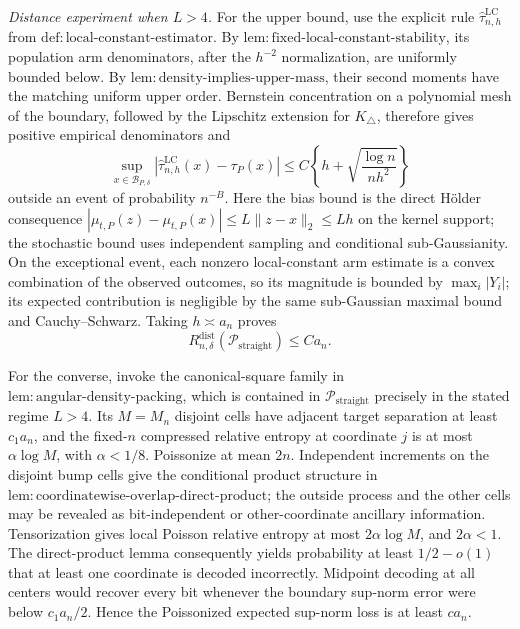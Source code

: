 \emph{Distance experiment when \(L>4\).}
For the upper bound, use the explicit rule \(\widehat\tau^{\mathrm{LC}}_{n,h}\) from \(\mathrm{def:local\text{-}constant\text{-}estimator}\).  By \(\mathrm{lem:fixed\text{-}local\text{-}constant\text{-}stability}\), its population arm denominators, after the \(h^{-2}\) normalization, are uniformly bounded below.  By \(\mathrm{lem:density\text{-}implies\text{-}upper\text{-}mass}\), their second moments have the matching uniform upper order.  Bernstein concentration on a polynomial mesh of the boundary, followed by the Lipschitz extension for \(K_\triangle\), therefore gives positive empirical denominators and
\[
 \sup_{x\in\mathcal B_{P,\delta}}
 |\widehat\tau^{\mathrm{LC}}_{n,h}(x)-\tau_P(x)|
 \leq C\left\{h+\sqrt{\frac{\log n}{nh^2}}\right\}
\]
outside an event of probability \(n^{-B}\).  Here the bias bound is the direct H\"older consequence
\(|\mu_{t,P}(z)-\mu_{t,P}(x)|\leq L\lVert z-x\rVert_2\leq Lh\) on the kernel support; the stochastic bound uses independent sampling and conditional sub-Gaussianity.  On the exceptional event, each nonzero local-constant arm estimate is a convex combination of the observed outcomes, so its magnitude is bounded by \(\max_i|Y_i|\); its expected contribution is negligible by the same sub-Gaussian maximal bound and Cauchy--Schwarz.  Taking \(h\asymp a_n\) proves
\[
 R_{n,\delta}^{\mathrm{dist}}(\mathcal P_{\mathrm{straight}})
 \leq Ca_n.
\]

For the converse, invoke the canonical-square family in \(\mathrm{lem:angular\text{-}density\text{-}packing}\), which is contained in \(\mathcal P_{\mathrm{straight}}\) precisely in the stated regime \(L>4\).  Its \(M=M_n\) disjoint cells have adjacent target separation at least \(c_1a_n\), and the fixed-\(n\) compressed relative entropy at coordinate \(j\) is at most \(\alpha\log M\), with \(\alpha<1/8\).  Poissonize at mean \(2n\).  Independent increments on the disjoint bump cells give the conditional product structure in \(\mathrm{lem:coordinatewise\text{-}overlap\text{-}direct\text{-}product}\); the outside process and the other cells may be revealed as bit-independent or other-coordinate ancillary information.  Tensorization gives local Poisson relative entropy at most \(2\alpha\log M\), and \(2\alpha<1\).  The direct-product lemma consequently yields probability at least \(1/2-o(1)\) that at least one coordinate is decoded incorrectly.  Midpoint decoding at all centers would recover every bit whenever the boundary sup-norm error were below \(c_1a_n/2\).  Hence the Poissonized expected sup-norm loss is at least \(ca_n\).

